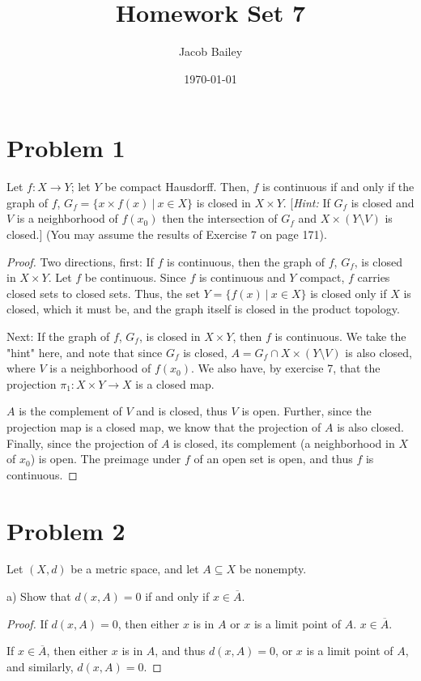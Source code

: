\documentclass[11pt]{article}
\author{Jacob Bailey}
\date{\today}
\title{Homework Set 7}
\begin{document}
\maketitle
\section{Problem 1}
\label{sec:org82952be}
Let \(f: X\rightarrow Y\); let \(Y\) be compact Hausdorff. Then, \(f\) is continuous
if and only if the graph of \(f\), \(G_f = \{ x\times f(x)\ |\ x\in X\}\) is closed
in \(X\times Y\). [\textit{Hint:} If \(G_f\) is closed and \(V\) is a neighborhood of
\(f(x_0)\) then the intersection of \(G_f\) and \(X\times (Y\setminus V)\) is closed.]
(You may assume the results of Exercise 7 on page 171). 

\begin{proof}
Two directions, first: If \(f\) is continuous, then the graph of \(f\), \(G_f\), is
closed in \(X\times Y\). Let \(f\) be continuous. Since \(f\) is continuous and \(Y\)
compact, \(f\) carries closed sets to closed sets. Thus, the set \(Y = \{f(x)\ |\
x\in X\}\) is closed only if \(X\) is closed, which it must be, and the graph
itself is closed in the product topology. 

Next: If the graph of \(f\), \(G_f\), is closed in \(X\times Y\), then \(f\) is
continuous. We take the "hint" here, and note that since \(G_f\) is closed, \(A =
G_f\cap X\times (Y\setminus V)\) is also closed, where \(V\) is a neighborhood of
\(f(x_0)\). We also have, by exercise 7, that the projection \(\pi_1: X\times
Y\rightarrow X\) is a closed map.

\(A\) is the complement of \(V\) and is closed, thus \(V\) is open. Further, since the
projection map is a closed map, we know that the projection of \(A\) is also
closed. Finally, since the projection of \(A\) is closed, its complement (a
neighborhood in \(X\) of \(x_0\)) is open. The preimage under \(f\) of an open set is
open, and thus \(f\) is continuous. 
\end{proof}

\section{Problem 2}
\label{sec:org4d80cc9}
Let \((X,d)\) be a metric space, and let \(A\subseteq X\) be nonempty. 

a) Show that \(d(x,A) = 0\) if and only if \(x \in \overline{A}\). 
\begin{proof}
If \(d(x,A) = 0\), then either \(x\) is in \(A\) or \(x\) is a limit point of \(A\). \(x
\in \overline{A}\). 

If \(x \in \overline{A}\), then either \(x\) is in \(A\), and thus \(d(x,A) = 0\), or
\(x\) is a limit point of \(A\), and similarly, \(d(x,A) = 0\). 
\end{proof}
\end{document}
